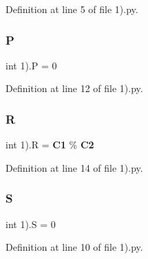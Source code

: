 Definition at line 5 of file 1).\+py.

\mbox{\label{namespace1_08_a56d386405427e0a1559c733ffd463098}} 
\subsubsection{P}
{\footnotesize\ttfamily int 1).P = 0}



Definition at line 12 of file 1).\+py.

\mbox{\label{namespace1_08_a0852165a3fe6c7dd520842be81ce2f02}} 
\subsubsection{R}
{\footnotesize\ttfamily int 1).R = \textbf{ C1} \% \textbf{ C2}}



Definition at line 14 of file 1).\+py.

\mbox{\label{namespace1_08_ad5e1e10e4401aec558c885a40211e0e1}} 
\subsubsection{S}
{\footnotesize\ttfamily int 1).S = 0}



Definition at line 10 of file 1).\+py.

